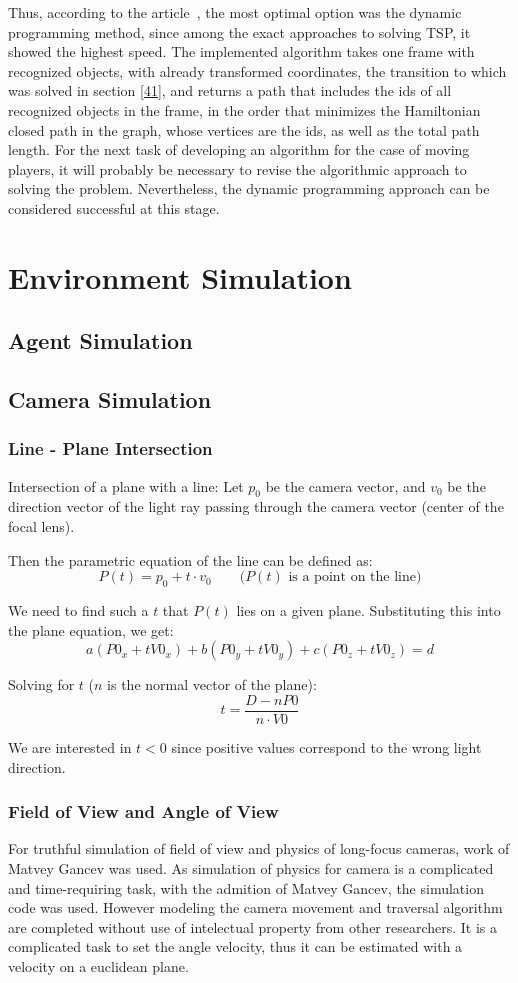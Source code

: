 Thus, according to the article~\cite{Zhang_2021}, the most optimal option was the dynamic programming method, since among the exact approaches to solving TSP, it showed the highest speed. The implemented algorithm takes one frame with recognized objects, with already transformed coordinates, the transition to which was solved in section \ref{41}, and returns a path that includes the ids of all recognized objects in the frame, in the order that minimizes the Hamiltonian closed path in the graph, whose vertices are the ids, as well as the total path length. For the next task of developing an algorithm for the case of moving players, it will probably be necessary to revise the algorithmic approach to solving the problem. Nevertheless, the dynamic programming approach can be considered successful at this stage.

\section{Environment Simulation}
\subsection{Agent Simulation}
\subsection{Camera Simulation}
\subsubsection{Line - Plane Intersection}
Intersection of a plane with a line:
Let $p_0$ be the camera vector, and $v_0$ be the direction vector of the light ray passing through the camera vector (center of the focal lens).

Then the parametric equation of the line can be defined as:
$$P(t) = p_0 + t \cdot v_0 \qquad \text{($P(t)$ is a point on the line)}$$

We need to find such a $t$ that $P(t)$ lies on a given plane.
Substituting this into the plane equation, we get:
$$a(P0_x + tV0_x) + b(P0_y + tV0_y) + c(P0_z + tV0_z) = d$$

Solving for $t$ ($n$ is the normal vector of the plane):
$$t = \frac{D - nP0}{n \cdot V0}$$

We are interested in $t < 0$ since positive values correspond to the wrong light direction.

\subsubsection{Field of View and Angle of View}
For truthful simulation of field of view and physics of long-focus cameras, work of Matvey Gancev was used. As simulation of physics for camera is a complicated and time-requiring task, with the admition of Matvey Gancev, the simulation code was used. However modeling the camera movement and traversal algorithm are completed without use of intelectual property from other researchers. It is a complicated task to set the angle velocity, thus it can be estimated with a velocity on a euclidean plane. 

